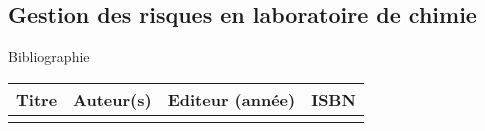 \begin{headerBlock}
\chapter{Gestion des risques en laboratoire de chimie}
\label{LC_GestionRisquesLabo}
 \end{headerBlock}



\begin{reportBlock}{Bibliographie}

\begin{center}
\begin{tabularx}{\textwidth}{| X | X | c | c |}\hline
Titre & Auteur(s) & Editeur (année) & ISBN \\ \hline
 &  &  &  \\ 
 \hline
\end{tabularx}
\end{center}

\end{reportBlock}

